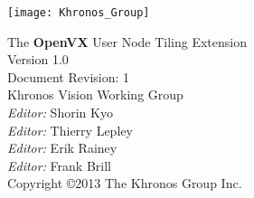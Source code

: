 \documentclass[oneside]{book}
\begin{document}
\hypersetup{pageanchor=false,citecolor=blue}
\begin{titlepage}
\vspace*{2cm}
\texttt{[image: Khronos\_Group]}
\vspace*{2cm}
\begin{center}
{\Huge The {\bf OpenVX\texttrademark} User Node Tiling Extension} \\
\vspace*{1cm}
{\Large Version 1.0} \\
\vspace*{0.25cm}
{\Large Document Revision: 1} \\
\vspace*{1cm}
{\Large Khronos Vision Working Group} \\
\vspace*{1cm}
{\Large {\it Editor:} Shorin Kyo} \\
{\Large {\it Editor:} Thierry Lepley} \\
{\Large {\it Editor:} Erik Rainey} \\
{\Large {\it Editor:} Frank Brill} \\
\vspace*{1cm}
{\Large Copyright \copyright 2013 The Khronos Group Inc.} \\
\end{center}
\end{titlepage}
\end{document}
